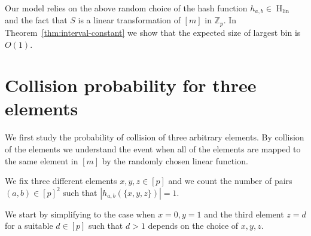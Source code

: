 \documentclass{article}
\newcommand{\hlin}{\operatorname{H}_{\operatorname{lin}}}
\begin{document}
Our model relies on the above random choice of the hash function $h_{a, b} \in \hlin$ and the fact that $S$ is a linear transformation of $[m]$ in $\mathbb{Z}_p$. In Theorem~\ref{thm:interval-constant} we show that the expected size of largest bin is $O(1)$.

\section{Collision probability for three elements}

We first study the probability of collision of three arbitrary elements.
By collision of the elements we understand the event when all of the elements are mapped to the same element in $[m]$ by the randomly chosen linear function.

We fix three different elements $x, y, z \in [p]$ and we count the number of pairs $(a, b) \in [p]^2$ such that $|h_{a, b}(\{x, y, z\})| = 1$.

We start by simplifying to the case when $x = 0, y = 1$ and the third element $z = d$ for a suitable $d \in [p]$ such that $d > 1$ depends on the choice of $x, y, z$.
\end{document}
